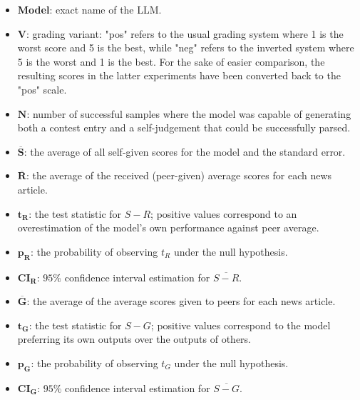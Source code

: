 \documentclass[noindent,nohyp,parspace,titlepage,twoside,12pt]{article}
\begin{document}
    \begin{itemize}
      \item \textbf{Model}: exact name of the LLM.

      \item $\mathbf{V}$: grading variant: "pos" refers to the usual grading
            system where 1 is the worst score and 5 is the best, while "neg"
            refers to the inverted system where 5 is the worst and 1 is the
            best. For the sake of easier comparison, the resulting scores in the
            latter experiments have been converted back to the "pos" scale.

      \item $\mathbf{N}$: number of successful samples where the model was
            capable of generating both a contest entry and a self-judgement that
            could be successfully parsed.

      \item $\mathbf{\overline{S}}$: the average of all self-given scores for
            the model and the standard error.

      \item $\mathbf{\overline{R}}$: the average of the received (peer-given)
            average scores for each news article.

      \item $\mathbf{t_R}$: the test statistic for $S - R$; positive values
            correspond to an overestimation of the model's own performance
            against peer average.

      \item $\mathbf{p_R}$: the probability of observing $t_R$ under the null
            hypothesis.

      \item $\mathbf{CI_R}$: $95\%$ confidence interval estimation for
            $\overline{S - R}$.

      \item $\mathbf{\overline{G}}$: the average of the average scores given to
            peers for each news article.

      \item $\mathbf{t_G}$: the test statistic for $S - G$; positive values
            correspond to the model preferring its own outputs over the outputs
            of others.

      \item $\mathbf{p_G}$: the probability of observing $t_G$ under the null
            hypothesis.

      \item $\mathbf{CI_G}$: $95\%$ confidence interval estimation for
            $\overline{S - G}$.
    \end{itemize}
\end{document}
